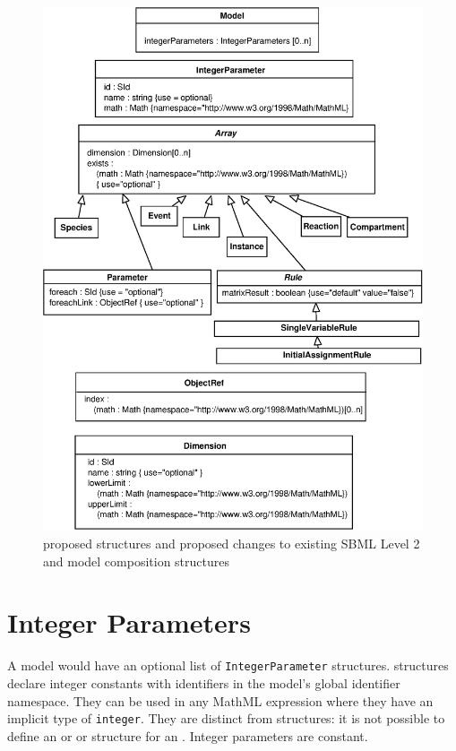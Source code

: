 \documentclass{cekarticle}
\begin{document}
\begin{figure}[h]
  \vspace*{8pt}
  \centering
  \includegraphics[scale = 0.7]{model}
  \caption{proposed structures and proposed changes to existing SBML Level 2 and model composition structures}
  \label{fig:model}
\end{figure}

\section{Integer Parameters}
\label{sec:integerParameters}

A model would have an optional list of
\texttt{IntegerParameter} structures.
 structures declare integer constants with identifiers in the model's global identifier namespace.
They can be used in any MathML expression where they have an implicit type of \texttt{integer}.
They are distinct from  structures: it is not possible to define an  or 
or  structure for an .  Integer parameters are constant.
\end{document}
